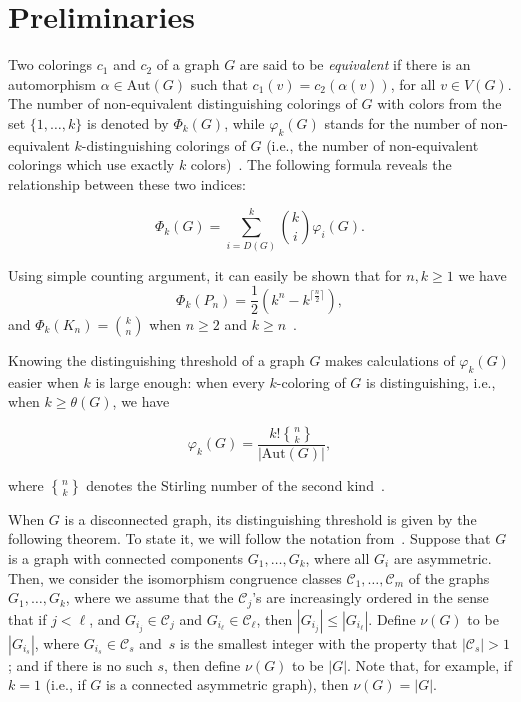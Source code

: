 \documentclass[12pt,a4paper, longbibliography]{article}
\newcommand{\aut}{\mathrm{Aut}}
\DeclareRobustCommand{\stirling}{\genfrac\{\}{0pt}{}}
\theoremstyle{definition}
\numberwithin{equation}{section}
\begin{document}
	\section{Preliminaries}\label{prelim}
	
	Two colorings $c_1$ and $c_2$ of a graph $G$ are said to be  \textit{equivalent} if there is an automorphism $\alpha\in\aut(G)$ such that $c_1(v) = c_2(\alpha(v))$, for all $v \in V(G)$. The  number of non-equivalent distinguishing colorings of $G$ with colors from the set $\{1, \ldots, k\}$ is denoted by $\Phi_k(G)$, while $\varphi_k(G)$ stands for the number of non-equivalent $k$-distinguishing colorings of $G$ (i.e., the number of non-equivalent colorings which use exactly $k$ colors)~\cite{ahmadi2020number}. The following formula reveals the relationship between these two indices:
	
	\[
	\Phi_k(G) = \sum_{i=D(G)}^k {k\choose i} \varphi_i(G).
	\]
	
	\noindent Using simple counting argument, it can easily be shown that for $ n,k \geq 1$ we have
	\begin{equation}\label{Phi_of_paths}
		\Phi_k(P_n) = \frac{1}{2}(k^n - k^{\lceil \frac{n}{2} \rceil}), 
	\end{equation}
	and $\Phi_k(K_n) = {k \choose n}$ when $n\geq 2$ and $k \geq n$~\cite{ahmadi2020number}. 
	
	Knowing the distinguishing threshold of a graph $G$ makes calculations of $\varphi_k(G)$ easier when $k$ is large enough: when every $k$-coloring of $G$ is distinguishing, i.e., when $k\geq\theta(G)$, we have 
	
	\begin{equation}
		\varphi_k (G)=\frac{k! \stirling{n}{k}}{|\aut(G)|},
	\end{equation} 
	
	\noindent where $\stirling{n}{k}$ denotes the Stirling number of the second kind~\cite{ahmadi2020number}.
	
	When $G$ is a disconnected graph, its distinguishing threshold is given by the following theorem. To state it, we will follow the notation from~\cite{ShekarrizAhmadiTH2021-theta}. Suppose that $G$ is a graph with connected components $G_1, \ldots, G_k$, where all   $G_i$ are asymmetric. Then, we consider the isomorphism congruence classes $\mathcal{C}_1,\ldots, \mathcal{C}_m$ of the graphs $G_1,\ldots, G_k$, where we assume that the $\mathcal{C}_j$'s are increasingly ordered in the sense that if $j<\ell$, and $G_{i_j}\in \mathcal{C}_j$ and $G_{i_\ell}\in \mathcal{C}_\ell$, then $|G_{i_j}|\leq |G_{i_\ell}|$. Define $\nu(G)$ to be $|G_{i_s}|$, where $G_{i_s}\in \mathcal{C}_s$ and~$s$ is the smallest integer with the property that $|\mathcal{C}_s|>1$; and if there is no such $s$, then define $\nu(G)$ to be $|G|$. Note that, for example, if $k=1$ (i.e., if $G$ is a connected asymmetric graph), then $\nu(G)=|G|$.
	
\end{document}
